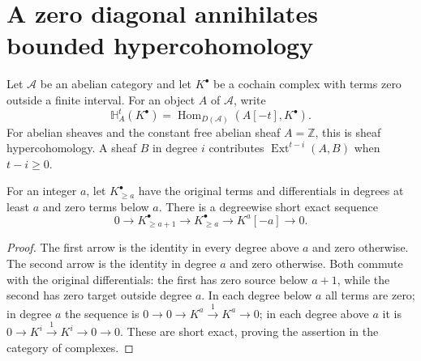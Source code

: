 \section{A zero diagonal annihilates bounded hypercohomology}

Let $\mathcal A$ be an abelian category and let $K^\bullet$ be a
cochain complex with terms zero outside a finite interval.  For an object
$A$ of $\mathcal A$, write
\[
 \mathbb H_A^t(K^\bullet)
 =\operatorname{Hom}_{D(\mathcal A)}(A[-t],K^\bullet).
\]
For abelian sheaves and the constant free abelian sheaf $A=\mathbb Z$,
this is sheaf hypercohomology.  A sheaf $B$ in degree $i$ contributes
$\operatorname{Ext}^{t-i}(A,B)$ when $t-i\geq0$.

\begin{lemma}
\label{lem:kn-hypercohomology-brutal-tail}
\leanok
For an integer $a$, let $K_{\geq a}^\bullet$ have the original terms
and differentials in degrees at least $a$ and zero terms below $a$.
There is a degreewise short exact sequence
\[
 0\longrightarrow K_{\geq a+1}^\bullet
 \longrightarrow K_{\geq a}^\bullet
 \longrightarrow K^a[-a]\longrightarrow0.
\]
\end{lemma}
\begin{proof}
The first arrow is the identity in every degree above $a$ and zero
otherwise.  The second arrow is the identity in degree $a$ and zero
otherwise.  Both commute with the original differentials: the first
has zero source below $a+1$, while the second has zero target outside
degree $a$.  In each degree below $a$ all terms are zero; in degree
$a$ the sequence is $0\to0\to K^a\xrightarrow{1}K^a\to0$; in each
degree above $a$ it is $0\to K^i\xrightarrow{1}K^i\to0\to0$.
These are short exact, proving the assertion in the category of
complexes.
\end{proof}

